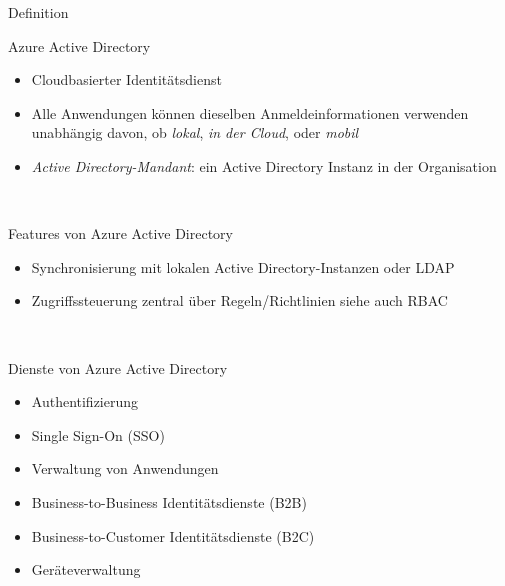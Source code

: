 \documentclass{scrartcl}
\newenvironment{flashcard}[2][]{%
    #1
    \vfill
    \centerline{\Large{#2}}
    \vfill
\newpage
}
{\newpage}
\begin{document}
    \begin{flashcard}[Definition]{Azure Active Directory}
        \begin{itemize}
            \item Cloudbasierter Identitätsdienst
            \item Alle Anwendungen können dieselben Anmeldeinformationen verwenden\newline
            unabhängig davon, ob \emph{lokal}, \emph{in der Cloud}, oder \emph{mobil}
            \item \emph{Active Directory-Mandant}: ein Active Directory Instanz in der Organisation
        \end{itemize}
    \end{flashcard}

    \begin{flashcard}[\ ]{Features von Azure Active Directory}
        \begin{itemize}
            \item Synchronisierung mit lokalen Active Directory-Instanzen oder LDAP
            \item Zugriffssteuerung zentral über Regeln/Richtlinien\newline
            siehe auch RBAC
        \end{itemize}
    \end{flashcard}

    \begin{flashcard}[\ ]{Dienste von Azure Active Directory}
        \begin{itemize}
            \item Authentifizierung
            \item Single Sign-On (SSO)
            \item Verwaltung von Anwendungen
            \item Business-to-Business Identitätsdienste (B2B)
            \item Business-to-Customer Identitätsdienste (B2C)
            \item Geräteverwaltung
        \end{itemize}
    \end{flashcard}
\end{document}
